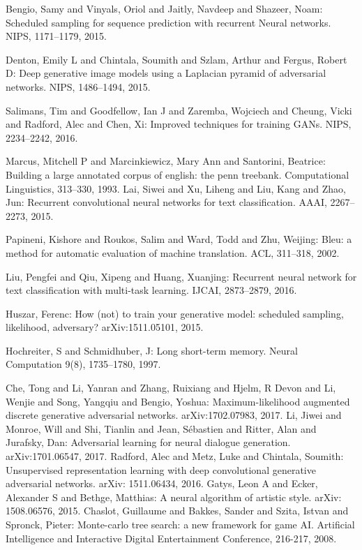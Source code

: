 \documentclass{llncs}
\begin{document}
\begin{thebibliography}{99}
 Bengio, Samy and Vinyals, Oriol and Jaitly, Navdeep and Shazeer, Noam: Scheduled sampling for sequence prediction with
 recurrent Neural networks. NIPS, 1171--1179, 2015.

 Denton, Emily L and Chintala, Soumith and Szlam, Arthur and Fergus, Robert D: Deep generative image models using a Laplacian pyramid of adversarial networks. NIPS, 1486--1494, 2015.

 Salimans, Tim and Goodfellow, Ian J and Zaremba, Wojciech and Cheung, Vicki and Radford, Alec and Chen, Xi: Improved techniques for training GANs. NIPS, 2234--2242, 2016.

 Marcus, Mitchell P and Marcinkiewicz, Mary Ann and Santorini, Beatrice: Building a large annotated corpus of english: the penn treebank. Computational Linguistics, 313--330, 1993.
 Lai, Siwei and Xu, Liheng and Liu, Kang and Zhao, Jun: Recurrent convolutional neural networks for text classification. AAAI, 2267--2273, 2015.

 Papineni, Kishore and Roukos, Salim and Ward, Todd and Zhu, Weijing: Bleu: a method for automatic evaluation of machine translation. 
ACL, 311--318, 2002.

 Liu, Pengfei and Qiu, Xipeng and Huang, Xuanjing: Recurrent neural network for text classification with multi-task learning.
 IJCAI, 2873--2879, 2016.

 Huszar, Ferenc: How (not) to train your generative model: scheduled sampling, likelihood, adversary? arXiv:1511.05101, 2015.

 Hochreiter, S and Schmidhuber, J: Long short-term memory. Neural Computation 9(8), 1735--1780, 1997.

 Che, Tong and Li, Yanran and Zhang, Ruixiang and Hjelm, R Devon and Li, Wenjie and Song, Yangqiu and Bengio, Yoshua: Maximum-likelihood augmented discrete generative adversarial networks. arXiv:1702.07983, 2017.
 Li, Jiwei and Monroe, Will and Shi, Tianlin and Jean, Sébastien and Ritter, Alan and Jurafsky, Dan: Adversarial learning for
 neural dialogue generation. arXiv:1701.06547, 2017.
 Radford, Alec and Metz, Luke and Chintala, Soumith: Unsupervised representation learning with deep convolutional generative adversarial networks. arXiv: 1511.06434, 2016.
 Gatys, Leon A and Ecker, Alexander S and Bethge, Matthias: A neural algorithm of artistic style. arXiv: 1508.06576, 2015.
 Chaslot, Guillaume and Bakkes, Sander and Szita, Istvan and Spronck, Pieter: Monte-carlo tree search: a new 
framework for game AI. Artificial Intelligence and Interactive Digital Entertainment Conference, 216-217, 2008.

\end{thebibliography}


\
\end{document}
